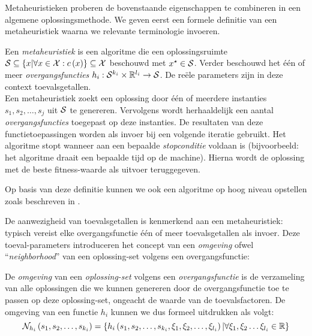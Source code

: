 Metaheuristieken proberen de bovenstaande eigenschappen te combineren in een algemene oplossingsmethode. We geven eerst een formele definitie van een metaheuristiek waarna we relevante terminologie invoeren.

\begin{definition}[Metaheuristiek]
Een \emph{metaheuristiek} is een algoritme die een oplossingsruimte $\mathcal{S}\subseteq\left\{ x|\forall x\in \mathcal{X}:c\left(x\right)\right\}\subseteq\mathcal{X}$ beschouwd met $x^{\star}\in\mathcal{S}$. Verder beschouwd het \'e\'en of meer \emph{overgangsfuncties} $h_i:\mathcal{S}^{k_i}\times\mathbb{R}^{l_i}\rightarrow\mathcal{S}$. De re\"ele parameters zijn in deze context toevalsgetallen.\\
Een metaheuristiek zoekt een oplossing door \'e\'en of meerdere instanties $s_1,s_2,\ldots,s_j$ uit $\mathcal{S}$ te genereren. Vervolgens wordt herhaaldelijk een aantal \emph{overgangsfuncties} toegepast op deze instanties. De resultaten van deze functietoepassingen worden als invoer bij een volgende iteratie gebruikt. Het algoritme stopt wanneer aan een bepaalde \emph{stopconditie} voldaan is (bijvoorbeeld: het algoritme draait een bepaalde tijd op de machine). Hierna wordt de oplossing met de beste fitness-waarde als uitvoer teruggegeven.
\end{definition}

Op basis van deze definitie kunnen we ook een algoritme op hoog niveau opstellen zoals beschreven in .


De aanwezigheid van toevalsgetallen is kenmerkend aan een metaheuristiek: typisch vereist elke overgangsfunctie \'e\'en of meer toevalsgetallen als invoer. Deze toeval-parameters introduceren het concept van een \emph{omgeving} ofwel ``\emph{neighborhood}'' van een oplossing-set volgens een overgangsfunctie:

\begin{definition}
De \emph{omgeving} van een \emph{oplossing-set} volgens een \emph{overgangsfunctie} is de verzameling van alle oplossingen die we kunnen genereren door de overgangsfunctie toe te passen op deze oplossing-set, ongeacht de waarde van de toevalsfactoren. De omgeving van een functie $h_i$ kunnen we dus formeel uitdrukken als volgt:
\begin{equation}
\mathcal{N}_{h_i}\left(s_1,s_2,\ldots,s_{k_i}\right)=\left\{ h_i\left(s_1,s_2,\ldots,s_{k_i},\xi_1,\xi_2,\ldots,\xi_{l_i}\right)|\forall \xi_1,\xi_2\ldots \xi_{l_i}\in\mathbb{R}\right\}
\end{equation}
\end{definition}

